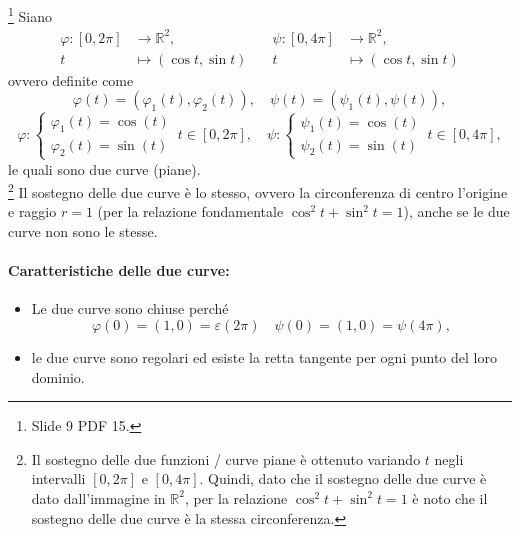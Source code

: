 \begin{example}\footnote{Slide 9 PDF 15.}
	Siano
	\begin{equation*}
			\begin{aligned}
				\varphi : [0,2\pi] &\rightarrow\mathbb{R}^2,\\
				t & \mapsto (\cos t, \sin t)
			\end{aligned}
			\quad
			\begin{aligned}
				\psi : [0,4\pi] &\rightarrow \mathbb{R}^2,\\
				t &\mapsto (\cos t, \sin t)
			\end{aligned}
	\end{equation*}
	ovvero definite come
	\begin{equation*}
		\varphi(t) = (\varphi_1(t),\varphi_2(t)),\quad \psi(t) = (\psi_1(t), \psi(t)),
	\end{equation*}
	\begin{equation*}
		\varphi :
		\begin{cases}
			\varphi_1(t) = \cos(t)\\
			\varphi_2(t) = \sin(t)
		\end{cases}\, t\in[0,2\pi],\quad
		\psi:
		\begin{cases}
			\psi_1(t) = \cos(t)\\
			\psi_2(t) = \sin(t)
		\end{cases}\, t\in[0,4\pi],
	\end{equation*}
	le quali sono due curve (piane).\\
	\footnote{Il sostegno delle due funzioni / curve piane è ottenuto variando $t$ negli intervalli $[0,2\pi]$ e $[0,4\pi]$. Quindi, dato che il sostegno delle due curve è dato dall'immagine in $\mathbb{R}^2$, per la relazione $\cos^2t+\sin^2t=1$ è noto che il sostegno delle due curve è la stessa circonferenza.} Il sostegno delle due curve è lo stesso, ovvero la circonferenza di centro l'origine e raggio $r=1$ (per la relazione fondamentale $\cos^2t+\sin^2t=1$), anche se le due curve non sono le stesse.
	\paragraph{Caratteristiche delle due curve:}
	\begin{itemize}
		\item Le due curve sono chiuse perché
		\begin{equation*}
			\varphi(0) = (1,0) = \varepsilon(2\pi) \quad \psi(0) = (1,0) = \psi(4\pi),
		\end{equation*}
		\item le due curve sono regolari ed esiste la retta tangente per ogni punto del loro dominio.
	\end{itemize}
\end{example}
 
